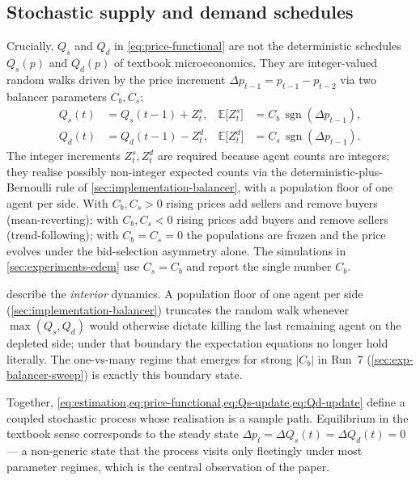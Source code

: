 \subsection{Stochastic supply and demand schedules}
\label{sec:framework-schedules}

Crucially, $Q_{s}$ and $Q_{d}$ in \cref{eq:price-functional} are not
the deterministic schedules $Q_{s}(p)$ and $Q_{d}(p)$ of textbook
microeconomics. They are integer-valued random walks driven by the
price increment $\Delta p_{t-1} = p_{t-1} - p_{t-2}$ via two balancer
parameters $C_{b}, C_{s}$:
\begin{align}
\label{eq:Qs-update}
Q_{s}(t) &= Q_{s}(t-1) + Z^{s}_{t},
& \mathbb{E}\bigl[Z^{s}_{t}\bigr] &= C_{b}\,\operatorname{sgn}(\Delta p_{t-1}), \\
\label{eq:Qd-update}
Q_{d}(t) &= Q_{d}(t-1) - Z^{d}_{t},
& \mathbb{E}\bigl[Z^{d}_{t}\bigr] &= C_{s}\,\operatorname{sgn}(\Delta p_{t-1}).
\end{align}
The integer increments $Z^{s}_{t}, Z^{d}_{t}$ are required because
agent counts are integers; they realise possibly non-integer expected
counts via the deterministic-plus-Bernoulli rule of
\cref{sec:implementation-balancer}, with a population floor of one
agent per side. With $C_{b}, C_{s} > 0$ rising prices add sellers
and remove buyers (mean-reverting); with $C_{b}, C_{s} < 0$ rising
prices add buyers and remove sellers (trend-following); with
$C_{b} = C_{s} = 0$ the populations are frozen and the price evolves
under the bid-selection asymmetry alone. The simulations in
\cref{sec:experiments-edem} use $C_{s} = C_{b}$ and report the
single number $C_{b}$.

 describe the \emph{interior}
dynamics. A population floor of one agent per side
(\cref{sec:implementation-balancer}) truncates the random walk
whenever $\max(Q_{s}, Q_{d})$ would otherwise dictate killing the
last remaining agent on the depleted side; under that boundary the
expectation equations no longer hold literally. The one-vs-many
regime that emerges for strong $|C_{b}|$ in Run~7
(\cref{sec:exp-balancer-sweep}) is exactly this boundary state.

Together,
\cref{eq:estimation,eq:price-functional,eq:Qs-update,eq:Qd-update}
define a coupled stochastic process whose realisation is a sample
path. Equilibrium in the textbook sense corresponds to the steady
state $\Delta p_{t} = \Delta Q_{s}(t) = \Delta Q_{d}(t) = 0$ --- a
non-generic state that the process visits only fleetingly under most
parameter regimes, which is the central observation of the paper.

